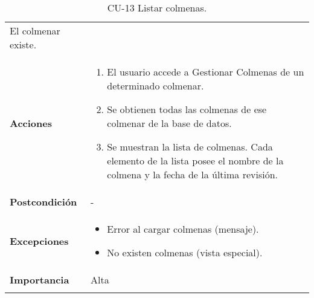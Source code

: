 \begin{longtable}[H]{@{}ll@{}}
\begin{minipage}[t]{0.68\columnwidth}
El colmenar existe.\strut
\end{minipage}\tabularnewline
\begin{minipage}[t]{0.26\columnwidth}\raggedright\strut
\textbf{Acciones}\strut
\end{minipage} & \begin{minipage}[t]{0.68\columnwidth}\raggedright\strut
\begin{enumerate}
\def\labelenumi{\arabic{enumi}.}
\tightlist
\item
  El usuario accede a Gestionar Colmenas de un determinado colmenar.
\item
  Se obtienen todas las colmenas de ese colmenar de la base de datos.
\item
  Se muestran la lista de colmenas. Cada elemento de la lista posee el
  nombre de la colmena y la fecha de la última revisión.
\end{enumerate}\strut
\end{minipage}\tabularnewline
\begin{minipage}[t]{0.26\columnwidth}\raggedright\strut
\textbf{Postcondición}\strut
\end{minipage} & \begin{minipage}[t]{0.68\columnwidth}\raggedright\strut
-\strut
\end{minipage}\tabularnewline
\begin{minipage}[t]{0.26\columnwidth}\raggedright\strut
\textbf{Excepciones}\strut
\end{minipage} & \begin{minipage}[t]{0.68\columnwidth}\raggedright\strut
\begin{itemize}
\tightlist
\item
  Error al cargar colmenas (mensaje).
\item
  No existen colmenas (vista especial).
\end{itemize}\strut
\end{minipage}\tabularnewline
\begin{minipage}[t]{0.26\columnwidth}\raggedright\strut
\textbf{Importancia}\strut
\end{minipage} & \begin{minipage}[t]{0.68\columnwidth}\raggedright\strut
Alta\strut
\end{minipage}\tabularnewline
\bottomrule
\caption{CU-13 Listar colmenas.}
\end{longtable}

